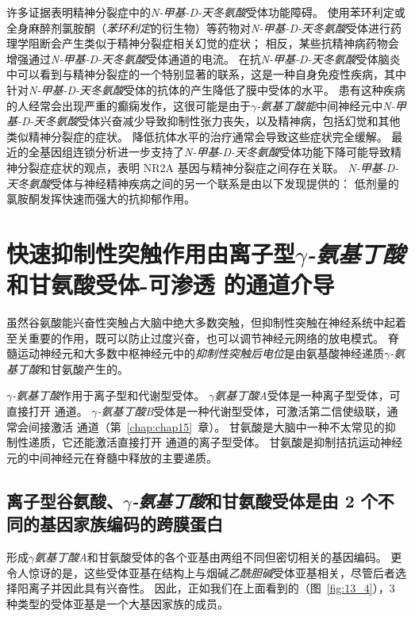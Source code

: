许多证据表明精神分裂症中的\textit{N-甲基-D-天冬氨酸}受体功能障碍。
使用苯环利定或全身麻醉剂氯胺酮（\textit{苯环利定}的衍生物）等药物对\textit{N-甲基-D-天冬氨酸}受体进行药理学阻断会产生类似于精神分裂症相关幻觉的症状；
相反，某些抗精神病药物会增强通过\textit{N-甲基-D-天冬氨酸}受体通道的电流。
在抗\textit{N-甲基-D-天冬氨酸}受体脑炎中可以看到与精神分裂症的一个特别显著的联系，这是一种自身免疫性疾病，其中针对\textit{N-甲基-D-天冬氨酸}受体的抗体的产生降低了膜中受体的水平。
患有这种疾病的人经常会出现严重的癫痫发作，这很可能是由于\textit{$\gamma$-氨基丁酸能}中间神经元中\textit{N-甲基-D-天冬氨酸}受体兴奋减少导致抑制性张力丧失，以及精神病，包括幻觉和其他类似精神分裂症的症状。
降低抗体水平的治疗通常会导致这些症状完全缓解。
最近的全基因组连锁分析进一步支持了\textit{N-甲基-D-天冬氨酸}受体功能下降可能导致精神分裂症症状的观点，表明 NR2A 基因与精神分裂症之间存在关联。
\textit{N-甲基-D-天冬氨酸}受体与神经精神疾病之间的另一个联系是由以下发现提供的：
低剂量的氯胺酮发挥快速而强大的抗抑郁作用。



\section{快速抑制性突触作用由离子型\textit{$\gamma$-氨基丁酸}和甘氨酸受体-可渗透  的通道介导}

虽然谷氨酸能兴奋性突触占大脑中绝大多数突触，但抑制性突触在神经系统中起着至关重要的作用，既可以防止过度兴奋，也可以调节神经元网络的放电模式。
脊髓运动神经元和大多数中枢神经元中的\textit{抑制性突触后电位}是由氨基酸神经递质\textit{$\gamma$-氨基丁酸}和甘氨酸产生的。


\textit{$\gamma$-氨基丁酸}作用于离子型和代谢型受体。
\textit{$\gamma$氨基丁酸A}受体是一种离子型受体，可直接打开  通道。
\textit{$\gamma$-氨基丁酸B}受体是一种代谢型受体，可激活第二信使级联，通常会间接激活  通道（第~\ref{chap:chap15}~章）。 
甘氨酸是大脑中一种不太常见的抑制性递质，它还能激活直接打开  通道的离子型受体。
甘氨酸是抑制拮抗运动神经元的中间神经元在脊髓中释放的主要递质。



\subsection{离子型谷氨酸、\textit{$\gamma$-氨基丁酸}和甘氨酸受体是由 2 个不同的基因家族编码的跨膜蛋白}

形成\textit{$\gamma$氨基丁酸A}和甘氨酸受体的各个亚基由两组不同但密切相关的基因编码。
更令人惊讶的是，这些受体亚基在结构上与烟碱\textit{乙酰胆碱}受体亚基相关，尽管后者选择阳离子并因此具有兴奋性。 
因此，正如我们在上面看到的（图~\ref{fig:13_4}），3 种类型的受体亚基是一个大基因家族的成员。


